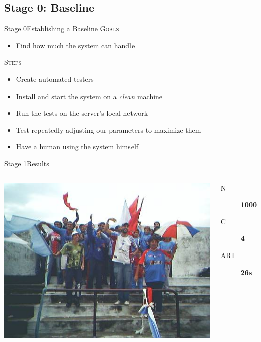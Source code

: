 \documentclass[utf8]{beamer}
\begin{document}
\subsection{Stage 0: Baseline}
\begin{frame}{Stage 0}{Establishing a Baseline}
	\textsc{Goals}
	\begin{itemize}
		\item Find how much the system can handle
	\end{itemize}
	\pause
	\textsc{Steps}
	\begin{itemize}
		\item Create automated testers
		\item Install and start the system on a \emph{clean} machine
		\item Run the tests on the server's local network
		\item Test repeatedly adjusting our parameters to maximize them
		\item Have a human using the system himself
	\end{itemize}
\end{frame}
\begin{frame}{Stage 1}{Results}
	\begin{columns}
			\includegraphics[top=-1,width=\textwidth]{img/results-1.jpg}
			\begin{description}
				\item[N] \textbf{\color{red}\Large 1000}
				\item[C] \textbf{\color{red}\Large 4}
				\item[ART] \textbf{\color{red}\Large 26s}
			\end{description}
	\end{columns}
\end{frame}
\end{document}

